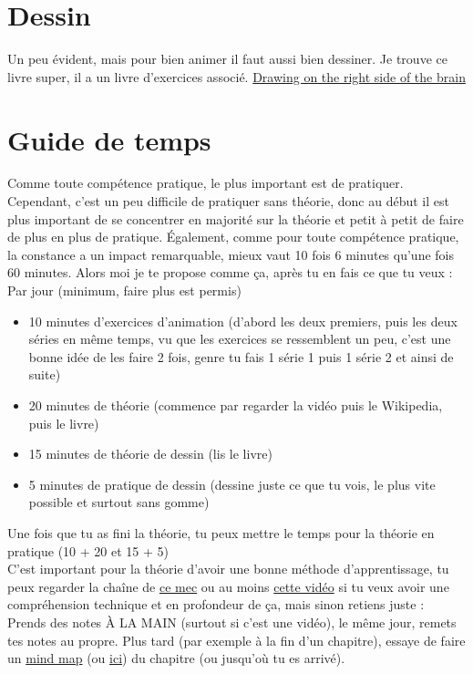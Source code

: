 \documentclass[12pt]{article}
\begin{document}
\section*{Dessin}
Un peu évident, mais pour bien animer il faut aussi bien dessiner. Je trouve ce livre super,
il a un livre d'exercices associé.
\href{https://www.amazon.com/New-Drawing-Right-Side-Brain/dp/0874774241/ref=sr_1_4?crid=2J16E9R86P4RS&dib=eyJ2IjoiMSJ9.Xuhg0WHBK64jwG3xzdJak41d2NUI1Ym7pF-5jjmkWqUf6LTXIY93Rj40w_EqEfqVCU7Qs5TNvqavsLll7HtHbiAASWLoXv8iPXLZxRRP9TYzF1Q59hOrpPMT7BpCNjQVwrGrk5SmJXtRNQQYw3--q_dJ3WjzZnJsF9T7OfDCIeT_PHFnBFBrCgalNvoEq_n4r8V6vy4jwemPA5vwmlrbieq-gQmI7UgyxJUqaDgzrmA.kl4TePk8hQsJYhxWBS9mySUZZ2rgduyNIVGgJ9NUngE&dib_tag=se&keywords=Drawing+on+the+Right+Side+of+the+Brain&qid=1713625911&s=books&sprefix=drawing+on+the+right+side+of+the+brain%2Cstripbooks-intl-ship%2C157&sr=1-4}{Drawing on the right side of the brain}

\section*{Guide de temps}
Comme toute compétence pratique, le plus important est de pratiquer. Cependant, c'est un peu
difficile de pratiquer sans théorie, donc au début il est plus important de se concentrer en majorité sur la théorie
et petit à petit de faire de plus en plus de pratique. Également, comme
pour toute compétence pratique, la constance a un impact remarquable, mieux vaut 10 fois 6 minutes qu'une fois 60 minutes.
Alors moi je te propose comme ça, après tu en fais ce que tu veux : \\
Par jour (minimum, faire plus est permis)
\begin{itemize}
\item 10 minutes d'exercices d'animation (d'abord les deux premiers, puis les deux séries en même temps, vu que les exercices se ressemblent un peu,
c'est une bonne idée de les faire 2 fois, genre tu fais 1 série 1 puis 1 série 2 et ainsi de suite)
\item 20 minutes de théorie (commence par regarder la vidéo puis le Wikipedia, puis le livre)
\item 15 minutes de théorie de dessin (lis le livre)
\item 5 minutes de pratique de dessin (dessine juste ce que tu vois, le plus vite possible et surtout sans gomme)
\end{itemize}

Une fois que tu as fini la théorie, tu peux mettre le temps pour la théorie en pratique (10 + 20 et 15 + 5)\\
C'est important pour la théorie d'avoir une bonne méthode d'apprentissage, tu peux regarder la chaîne de
\href{https://www.youtube.com/@ArtemKirsanov}{ce mec} ou au moins \href{https://youtu.be/RVB3PBPxMWg?si=pxJQ9ZSSEITsK11r}{cette vidéo}
si tu veux avoir une compréhension technique et en profondeur de ça, mais sinon retiens juste : \\
Prends des notes À LA MAIN (surtout si c'est une vidéo), le même jour, remets tes notes au propre. Plus tard (par exemple
à la fin d'un chapitre), essaye de faire un \href{https://youtu.be/qic-4OTM9yI?si=h4JxZlchLxyfWI2p}{mind map} (ou \href{https://youtu.be/8ueBiBOTs9E?si=IJpvLEDKzlWHy2ql}{ici}) du chapitre (ou jusqu'où tu es arrivé).
\end{document}
